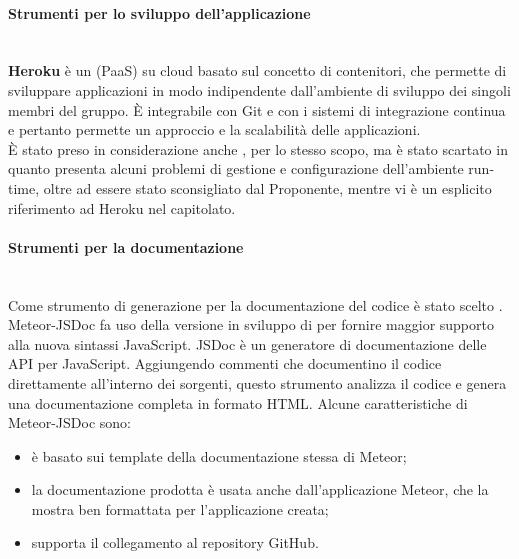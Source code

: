 \paragraph{Strumenti per lo sviluppo dell'applicazione}\mbox{}\\
\textbf{Heroku} è un  (PaaS) su cloud basato sul concetto di contenitori, che permette di sviluppare applicazioni in modo indipendente dall'ambiente di sviluppo dei singoli membri del gruppo. \`{E} integrabile con Git e con i sistemi di integrazione continua e pertanto permette un approccio  e la scalabilità delle applicazioni.\\
\`{E} stato preso in considerazione anche , per lo stesso scopo, ma è stato scartato in quanto presenta alcuni problemi di gestione e configurazione dell'ambiente run-time, oltre ad essere stato sconsigliato dal Proponente, mentre vi è un esplicito riferimento ad Heroku nel capitolato.

\paragraph{Strumenti per la documentazione}\mbox{}\\
Come strumento di generazione per la documentazione del codice è stato scelto \textbf{}.\\
Meteor-JSDoc fa uso della versione in sviluppo di \textbf{} per fornire maggior supporto alla nuova sintassi JavaScript.
JSDoc è un generatore di documentazione delle API per JavaScript. Aggiungendo commenti che documentino il codice direttamente all'interno dei sorgenti, questo strumento analizza il codice e genera una documentazione completa in formato HTML.
Alcune caratteristiche di Meteor-JSDoc sono:
\begin{itemize}
	\item è basato sui template della documentazione stessa di Meteor;
	\item la documentazione prodotta è usata anche dall'applicazione Meteor, che la mostra ben formattata per l'applicazione creata;
	\item supporta il collegamento al repository GitHub.
\end{itemize}

